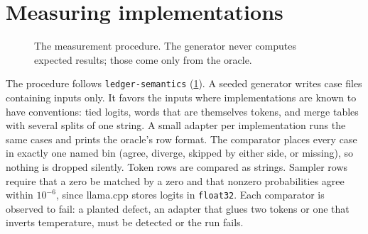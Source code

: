 \documentclass[10pt]{article}
\theoremstyle{qpt}
\begin{document}
\section{Measuring implementations}\label{sec:measure}

\begin{figure}[t]
\centering
{}
\caption{The measurement procedure. The generator never computes expected results;
those come only from the oracle.}
\label{fig:harness}
\end{figure}

The procedure follows \texttt{ledger-semantics} (\cref{fig:harness}). A seeded
generator writes case files containing inputs only. It favors the inputs where
implementations are known to have conventions: tied logits, words that are
themselves tokens, and merge tables with several splits of one string. A small
adapter per implementation runs the same cases and prints the oracle's row format.
The comparator places every case in exactly one named bin (agree, diverge, skipped
by either side, or missing), so nothing is dropped silently. Token rows are compared
as strings. Sampler rows require that a zero be matched by a zero and that nonzero
probabilities agree within $10^{-6}$, since llama.cpp stores logits in
\texttt{float32}. Each comparator is observed to fail: a planted defect, an adapter
that glues two tokens or one that inverts temperature, must be detected or the run
fails.
\end{document}
